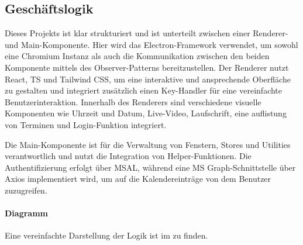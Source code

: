\subsection{Geschäftslogik}
\label{sec:Geschaeftslogik}

Dieses Projekts ist klar strukturiert und ist unterteilt zwischen einer Renderer- und Main-Komponente.
Hier wird das Electron-Framework verwendet, um sowohl eine Chromium Instanz als auch die Kommunikation zwischen den beiden Komponente mittels des Observer-Patterns bereitzustellen.
Der Renderer nutzt React, \ac{TS} und Tailwind \ac{CSS}, um eine interaktive und ansprechende Oberfläche zu gestalten und integriert zusätzlich einen Key-Handler für eine vereinfachte Benutzerinteraktion.
Innerhalb des Renderers sind verschiedene visuelle Komponenten wie Uhrzeit und Datum, Live-Video, Laufschrift, eine auflistung von Terminen und Login-Funktion integriert.

Die Main-Komponente ist für die Verwaltung von Fenstern, Stores und Utilities verantwortlich und nutzt die Integration von Helper-Funktionen.
Die Authentifizierung erfolgt über \ac{MSAL}, während eine \ac{MS} Graph-Schnittstelle über Axios implementiert wird, um auf die Kalendereinträge von dem Benutzer zuzugreifen.

\paragraph{Diagramm}
Eine vereinfachte Darstellung der Logik ist im  zu finden.



